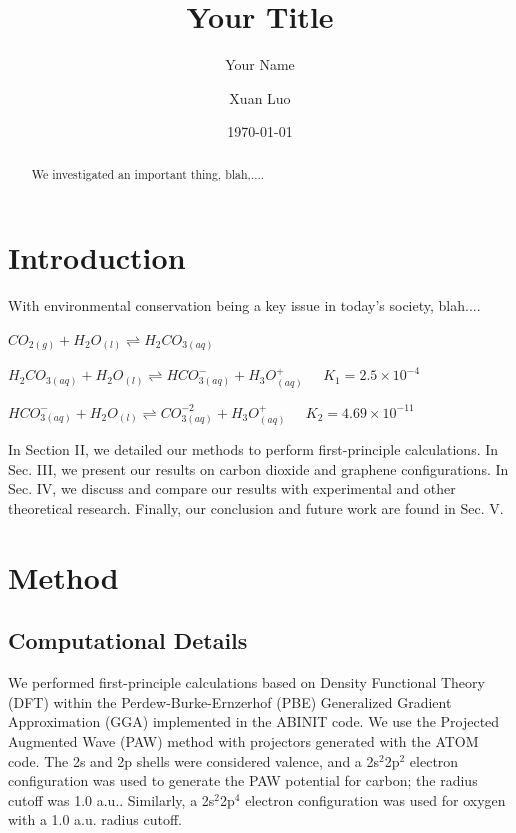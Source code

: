 \documentclass[journal=jacsat,manuscript=article]{achemso}
\title{Your Title }
\author{Your Name}
\affiliation{ Your School}
\author{Xuan Luo}
\affiliation{ National Graphene Research and Development Center, Springfield, Virginia 22151, USA}
\date{\today}
\begin{document}
\begin{abstract}
\setlength{\parindent}{1cm}
We investigated an important thing, blah,....

\end{abstract}

\newpage
\maketitle
\section{Introduction}
With environmental conservation being a key issue in today's society, blah....


$CO_{2 (g)} + H_{2}O_{(l)} \rightleftharpoons H_{2}CO_{3 (aq)}$

$H_{2}CO_{3 (aq)} + H_{2}O_{(l)} \rightleftharpoons HCO_{3 (aq)}^{-} + H_{3}O^{+}_{(aq)} \; \; \; \; \; K_{1} = 2.5 \times 10^{-4}$

$HCO_{3 (aq)}^{-} + H_{2}O_{(l)} \rightleftharpoons CO_{3 (aq)}^{-2} + H_{3}O^{+}_{(aq)} \; \; \; \; \; K_{2} = 4.69 \times 10^{-11}$ 


In Section II, we detailed our methods to perform first-principle calculations. In Sec. III, we present our results on carbon dioxide and graphene configurations.
In Sec. IV, we discuss and compare our results with experimental and other theoretical research. Finally, our conclusion and future work are found in Sec. V.

\section{Method}

\subsection{Computational Details}

We performed first-principle calculations based on Density Functional
Theory (DFT) within the Perdew-Burke-Ernzerhof (PBE) Generalized
Gradient Approximation (GGA) implemented in the ABINIT\cite{gonze2009}
code. We use the Projected Augmented Wave (PAW) method\cite{blochl1994} with
projectors generated with the ATOM code\cite{holzwarth2001}. 
The 2s and 2p shells were considered valence, and a 2s$^{2}$2p$^{2}$ electron configuration was used to generate the PAW potential for carbon; the radius cutoff was 1.0 a.u.. 
Similarly, a 2s$^{2}$2p$^{4}$ electron configuration was used for oxygen with a 1.0 a.u.  radius cutoff.
\end{document}
